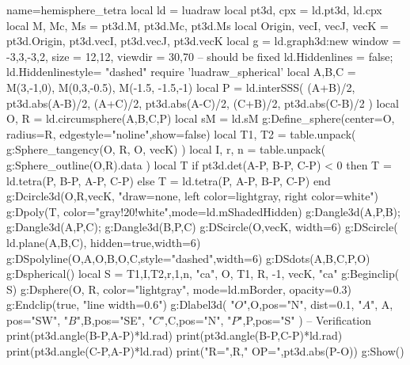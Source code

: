 \documentclass{standalone}
\begin{document}
\begin{luadraw}{name=hemisphere_tetra}
local ld = luadraw
local pt3d, cpx = ld.pt3d, ld.cpx
local M, Mc, Ms = pt3d.M, pt3d.Mc, pt3d.Ms
local Origin, vecI, vecJ, vecK = pt3d.Origin, pt3d.vecI, pt3d.vecJ, pt3d.vecK
local g = ld.graph3d:new{
    window = {-3,3,-3,2}, size = {12,12},
    viewdir = {30,70} -- should be fixed
}
ld.Hiddenlines = false; ld.Hiddenlinestyle= "dashed"
require 'luadraw_spherical'
local A,B,C = M(3,-1,0), M(0,3,-0.5), M(-1.5, -1.5,-1)
local P = ld.interSSS( {(A+B)/2, pt3d.abs(A-B)/2}, {(A+C)/2, pt3d.abs(A-C)/2}, {(C+B)/2, pt3d.abs(C-B)/2} )
local O, R = ld.circumsphere(A,B,C,P)
local sM = ld.sM
g:Define_sphere({center=O, radius=R, edgestyle="noline",show=false})
local T1, T2 = table.unpack( g:Sphere_tangency(O, R, {O, vecK}) )
local I, r, n = table.unpack( g:Sphere_outline(O,R).data )
local T
if pt3d.det(A-P, B-P, C-P) < 0 then 
    T = ld.tetra(P, B-P, A-P, C-P)
else 
    T = ld.tetra(P, A-P, B-P, C-P)
end
g:Dcircle3d(O,R,vecK, "draw=none, left color=lightgray, right color=white")
g:Dpoly(T, {color="gray!20!white",mode=ld.mShadedHidden})
g:Dangle3d(A,P,B); g:Dangle3d(A,P,C); g:Dangle3d(B,P,C)
g:DScircle({O,vecK}, {width=6})
g:DScircle( ld.plane(A,B,C), {hidden=true,width=6})
g:DSpolyline({{O,A},{O,B},{O,C}},{style="dashed",width=6})
g:DSdots({A,B,C,P,O})
g:Dspherical()
local S = {T1,I,T2,r,1,n, "ca", O, T1, R, -1, vecK, "ca"}
g:Beginclip( S)
    g:Dsphere(O, R, {color="lightgray", mode=ld.mBorder, opacity=0.3})
g:Endclip(true, "line width=0.6")
g:Dlabel3d(
    "$O$",O,{pos="N", dist=0.1}, "$A$", A, {pos="SW"},
    "$B$",B,{pos="SE"},
    "$C$",C,{pos="N"},
    "$P$",P,{pos="S"}
)
-- Verification
print(pt3d.angle(B-P,A-P)*ld.rad)
print(pt3d.angle(B-P,C-P)*ld.rad)
print(pt3d.angle(C-P,A-P)*ld.rad)
print("R=",R," OP=",pt3d.abs(P-O))
g:Show()
\end{luadraw}
\end{document}
